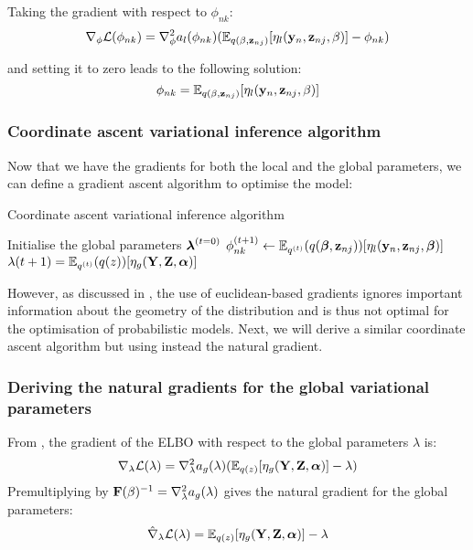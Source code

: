 Taking the gradient with respect to $\phi_{nk}$:
\begin{equation} \label{gradient_local}
	\nabla_{\phi} \mathcal{L}(\phi_{nk}) = \nabla_{\phi}^2 a_l(\phi_{nk}) (\mathbb{E}_{q(\beta,{\bf z}_{nj})}[\eta_l({\bf y}_n,{\bf z}_{nj},\beta)] - \phi_{nk})
\end{equation}

and setting it to zero leads to the following solution:
\begin{equation} \label{solution_local}
	\phi_{nk} = \mathbb{E}_{q(\beta,{\bf z}_{nj})}[\eta_l({\bf y}_{n},{\bf z}_{nj},\beta)]
\end{equation}


\subsubsection{Coordinate ascent variational inference algorithm}

Now that we have the gradients for both the local and the global parameters, we can define a gradient ascent algorithm to optimise the model:

\begin{algorithm}
  \caption{Coordinate ascent variational inference algorithm}
  \begin{algorithmic}[1]
	\State Initialise the global parameters $\mbox{\boldmath $\lambda$}^{(t=0)}$
	\Repeat
			\State $ \phi_{nk}^{(t+1)} \gets \mathbb{E}_{q^{(t)}}(q(\mbox{\boldmath $\beta$},{\bf z}_{nj}))[\eta_l({\bf y}_{n},{\bf z}_{nj},\mbox{\boldmath $\beta$})] $
      	\EndFor
			\State $ \lambda{(t+1)}= \mathbb{E}_{q^{(t)}}(q(z))[\eta_g({\bf Y},{\bf Z},\mbox{\boldmath $\alpha$})] $
      	\EndFor
	\end{algorithmic}
\end{algorithm}

However, as discussed in , the use of euclidean-based gradients ignores important information about the geometry of the distribution and is thus not optimal for the optimisation of probabilistic models. Next, we will derive a similar coordinate ascent algorithm but using instead the natural gradient.


\subsubsection{Deriving the natural gradients for the global variational parameters}

From , the gradient of the ELBO with respect to the global parameters $\lambda$ is:
\[
	\nabla_{\lambda} \mathcal{L}(\lambda) = \nabla_{\lambda}^{2} a_g(\lambda)(\mathbb{E}_{q(z)}[\eta_g({\bf Y},{\bf Z},\mbox{\boldmath $\alpha$})] - \lambda)
\]
Premultiplying by ${\bf F}(\beta)^{-1}=\nabla_{\lambda}^{2} a_g(\lambda)$ gives the natural gradient for the global parameters:
\[
	\hat{\nabla}_{\lambda} \mathcal{L}(\lambda) = \mathbb{E}_{q(z)}[\eta_g({\bf Y},{\bf Z},\mbox{\boldmath $\alpha$})] - \lambda
\]


